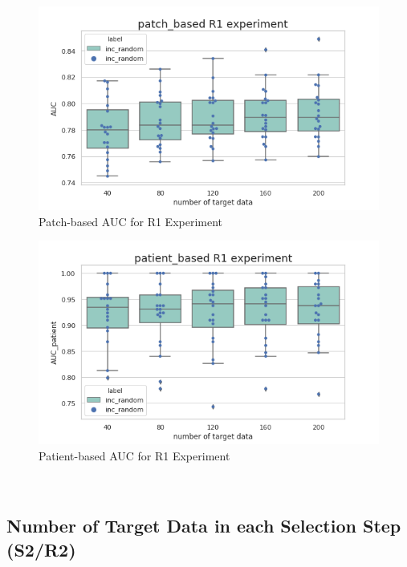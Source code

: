 \begin{figure}[H]
    \hfil
    \begin{minipage}[t]{0.9\textwidth}
        \includegraphics[width=\textwidth]{fig/R1_num_patch.png}
        \caption{\label{fig:parallel1}Patch-based AUC for R1 Experiment}
    \end{minipage}
    \hfil
\end{figure}
\begin{figure}[H]
    \hfil
    \begin{minipage}[t]{0.9\textwidth}
        \includegraphics[width=\textwidth]{fig/R1_num_patient.png}
        \caption{\label{fig:parallel1}Patient-based AUC for R1 Experiment}
    \end{minipage}
    \hfil
\end{figure}
~\\
\subsection{Number of Target Data in each Selection Step (S2/R2)}

